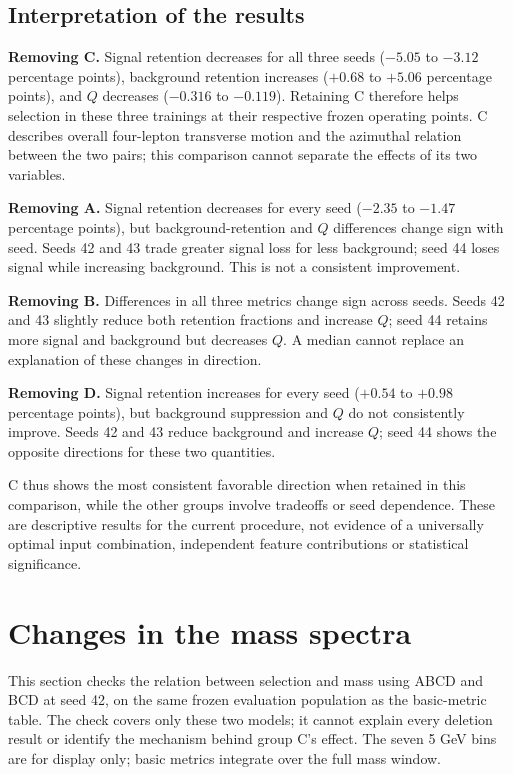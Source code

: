 \documentclass[11pt,a4paper]{article}
\begin{document}
\subsection{Interpretation of the results}
\textbf{Removing C.} Signal retention decreases for all three seeds ($-5.05$ to $-3.12$ percentage points), background retention increases ($+0.68$ to $+5.06$ percentage points), and $Q$ decreases ($-0.316$ to $-0.119$).
Retaining C therefore helps selection in these three trainings at their respective frozen operating points.
C describes overall four-lepton transverse motion and the azimuthal relation between the two pairs; this comparison cannot separate the effects of its two variables.

\textbf{Removing A.} Signal retention decreases for every seed ($-2.35$ to $-1.47$ percentage points), but background-retention and $Q$ differences change sign with seed.
Seeds 42 and 43 trade greater signal loss for less background; seed 44 loses signal while increasing background. This is not a consistent improvement.

\textbf{Removing B.} Differences in all three metrics change sign across seeds.
Seeds 42 and 43 slightly reduce both retention fractions and increase $Q$; seed 44 retains more signal and background but decreases $Q$.
A median cannot replace an explanation of these changes in direction.

\textbf{Removing D.} Signal retention increases for every seed ($+0.54$ to $+0.98$ percentage points), but background suppression and $Q$ do not consistently improve.
Seeds 42 and 43 reduce background and increase $Q$; seed 44 shows the opposite directions for these two quantities.

C thus shows the most consistent favorable direction when retained in this comparison, while the other groups involve tradeoffs or seed dependence.
These are descriptive results for the current procedure, not evidence of a universally optimal input combination, independent feature contributions or statistical significance.
\FloatBarrier

\section{Changes in the mass spectra}
This section checks the relation between selection and mass using ABCD and BCD at seed 42, on the same frozen evaluation population as the basic-metric table.
The check covers only these two models; it cannot explain every deletion result or identify the mechanism behind group C's effect.
The seven 5 GeV bins are for display only; basic metrics integrate over the full mass window.
\end{document}
